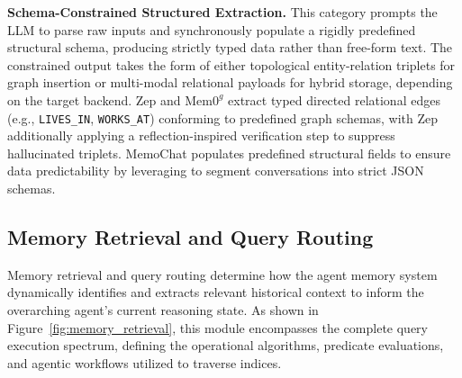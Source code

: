\noindent {} \textbf{Schema-Constrained Structured Extraction.}
This category prompts the LLM to parse raw inputs and synchronously populate a rigidly predefined structural schema, producing strictly typed data rather than free-form text. The constrained output takes the form of either topological entity-relation triplets for graph insertion or multi-modal relational payloads for hybrid storage, depending on the target backend.
Zep and $\text{Mem0}^g$ extract typed directed relational edges (e.g., \texttt{LIVES\_IN}, \texttt{WORKS\_AT}) conforming to predefined graph schemas, with Zep additionally applying a reflection-inspired verification step to suppress hallucinated triplets.
MemoChat populates predefined structural fields to ensure data predictability by leveraging \llms to segment conversations into strict JSON schemas.



\subsection{Memory Retrieval and Query Routing}
\label{subsec:retrieval}

Memory retrieval and query routing determine how the agent memory system dynamically identifies and extracts relevant historical context to inform the overarching agent's current reasoning state.
As shown in Figure~\ref{fig:memory_retrieval}, this module encompasses the complete query execution spectrum, defining the operational algorithms, predicate evaluations, and agentic workflows utilized to traverse indices. 




